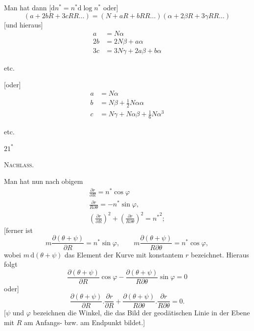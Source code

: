 Man hat dann [$\mathrm dn^*=n^*\mathrm d\log n^*$ oder]
\[
(a+2bR+3cRR\ldots)=(N+aR+bRR\ldots)(\alpha+2\beta R+3\gamma RR\ldots)
\]
[und hieraus]
\[
\begin{aligned}
a&=N\alpha\\
2b&=2N\beta+a\alpha\\
3c&=3N\gamma+2a\beta+b\alpha
\end{aligned}
\]
\begin{center}etc.\end{center}
[oder]
\[
\begin{aligned}
a&=N\alpha\\
b&=N\beta+\tfrac12N\alpha\alpha\\
c&=N\gamma+N\alpha\beta+\tfrac16N\alpha^3
\end{aligned}
\]
\begin{center}etc.\end{center}
\vfill\hfill$21^*$\hspace*{2cm}\par
\clearpage
{}\hfill\textsc{Nachlass.}\hfill\mbox{}\par\medskip
\begingroup\small
Man hat nun nach obigem
\[
\begin{gathered}
\frac{\partial r}{\partial R}=n^*\cos\varphi\\
\frac{\partial r}{R\partial\theta}=-n^*\sin\varphi,\\
\left(\frac{\partial r}{\partial R}\right)^2+\left(\frac{\partial r}{R\partial\theta}\right)^2={n^*}^2;
\end{gathered}
\]
[ferner ist
\[
m\frac{\partial(\theta+\psi)}{\partial R}=n^*\sin\varphi,\qquad m\frac{\partial(\theta+\psi)}{R\partial\theta}=n^*\cos\varphi,
\]
wobei $m\,\mathrm d(\theta+\psi)$ das Element der Kurve mit konstantem $r$ bezeichnet. Hieraus folgt
\[
\frac{\partial(\theta+\psi)}{\partial R}\cos\varphi-\frac{\partial(\theta+\psi)}{R\partial\theta}\sin\varphi=0
\]
oder]
\[
\frac{\partial(\theta+\psi)}{\partial R}.\frac{\partial r}{\partial R}+\frac{\partial(\theta+\psi)}{R\partial\theta}.\frac{\partial r}{R\partial\theta}=0.
\]
[$\psi$ und $\varphi$ bezeichnen die Winkel, die das Bild der geodätischen Linie in der Ebene mit $R$ am Anfangs- bzw. am Endpunkt bildet.]

